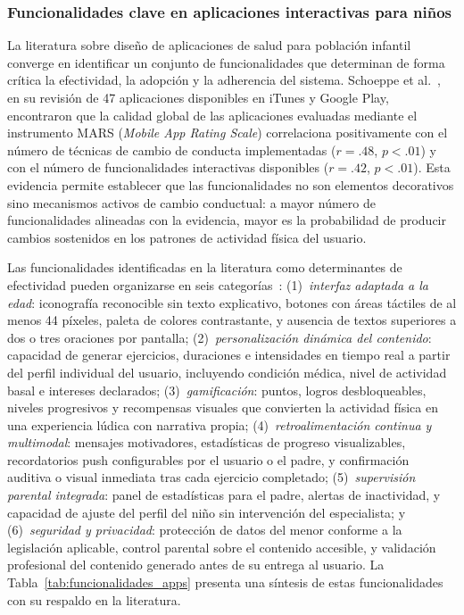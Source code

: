 				\subsubsection{Funcionalidades clave en aplicaciones interactivas para niños}
					La literatura sobre diseño de aplicaciones de salud para población infantil converge en identificar un conjunto de funcionalidades que determinan de forma crítica la efectividad, la adopción y la adherencia del sistema. Schoeppe et al.~\cite{Schoeppe2017}, en su revisión de 47 aplicaciones disponibles en iTunes y Google Play, encontraron que la calidad global de las aplicaciones evaluadas mediante el instrumento MARS (\textit{Mobile App Rating Scale}) correlaciona positivamente con el número de técnicas de cambio de conducta implementadas ($r = .48$, $p < .01$) y con el número de funcionalidades interactivas disponibles ($r = .42$, $p < .01$). Esta evidencia permite establecer que las funcionalidades no son elementos decorativos sino mecanismos activos de cambio conductual: a mayor número de funcionalidades alineadas con la evidencia, mayor es la probabilidad de producir cambios sostenidos en los patrones de actividad física del usuario.
					
					Las funcionalidades identificadas en la literatura como determinantes de efectividad pueden organizarse en seis categorías~\cite{Schoeppe2017,WangJun2024,Baumann2022,WangGamif2025}: (1)~\textit{interfaz adaptada a la edad}: iconografía reconocible sin texto explicativo, botones con áreas táctiles de al menos 44 píxeles, paleta de colores contrastante, y ausencia de textos superiores a dos o tres oraciones por pantalla; (2)~\textit{personalización dinámica del contenido}: capacidad de generar ejercicios, duraciones e intensidades en tiempo real a partir del perfil individual del usuario, incluyendo condición médica, nivel de actividad basal e intereses declarados; (3)~\textit{gamificación}: puntos, logros desbloqueables, niveles progresivos y recompensas visuales que convierten la actividad física en una experiencia lúdica con narrativa propia; (4)~\textit{retroalimentación continua y multimodal}: mensajes motivadores, estadísticas de progreso visualizables, recordatorios push configurables por el usuario o el padre, y confirmación auditiva o visual inmediata tras cada ejercicio completado; (5)~\textit{supervisión parental integrada}: panel de estadísticas para el padre, alertas de inactividad, y capacidad de ajuste del perfil del niño sin intervención del especialista; y (6)~\textit{seguridad y privacidad}: protección de datos del menor conforme a la legislación aplicable, control parental sobre el contenido accesible, y validación profesional del contenido generado antes de su entrega al usuario. La Tabla~\ref{tab:funcionalidades_apps} presenta una síntesis de estas funcionalidades con su respaldo en la literatura.
					
